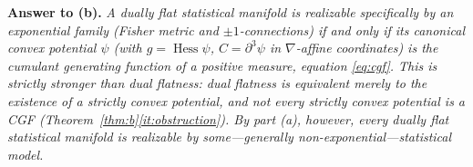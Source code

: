 \documentclass{amsart}
\theoremstyle{definition}
\theoremstyle{remark}
\begin{document}
\medskip
\noindent\textbf{Answer to (b).}
\emph{A dually flat statistical manifold is realizable specifically by an
exponential family (Fisher metric and $\pm1$-connections) if and only if its
canonical convex potential $\psi$ (with $g=\operatorname{Hess}\psi$,
$C=\partial^{3}\psi$ in $\nabla$-affine coordinates) is the cumulant generating
function of a positive measure, equation \eqref{eq:cgf}. This is strictly
stronger than dual flatness: dual flatness is equivalent merely to the existence
of a strictly convex potential, and not every strictly convex potential is a CGF
(Theorem~\ref{thm:b}\eqref{it:obstruction}). By part (a), however, every dually
flat statistical manifold is realizable by some---generally
non-exponential---statistical model.}
\end{document}
